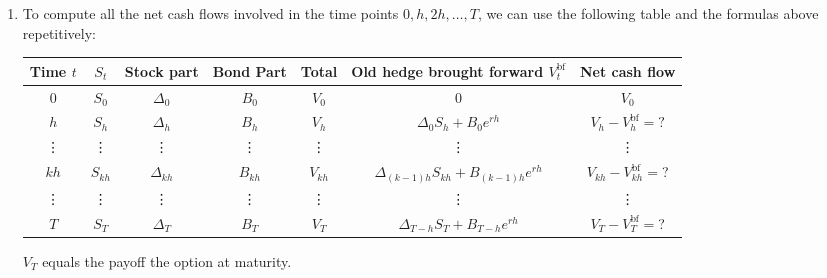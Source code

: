 \begin{enumerate}
\item To compute all the net cash flows involved in the time points
\(0,h,2h,\dotsc,T\), we can use the following table and the formulas above
repetitively:
\begin{center}
\begin{tabular}{cc|ccc|cc}
\toprule
Time \(t\)&\(S_t\)&Stock part& Bond Part&Total&Old hedge brought forward \(V_t^{\mathrm{bf}}\)&Net cash flow\\
\midrule
\(0\)&\(S_0\)&\(\Delta_0\)&\(B_0\)&\(V_0\)&\(0\)&\(V_0\) \\
\(h\)&\(S_h\)&\(\Delta_h\)&\(B_h\)&\(V_h\)&\(\Delta_0 S_h+B_0e^{rh}\)&\(V_h-V_h^{\mathrm{bf}}=?\)\\
\vdots&\vdots&\vdots&\vdots&\vdots&\vdots&\vdots \\
\(kh\)&\(S_{kh}\)&\(\Delta_{kh}\)&\(B_{kh}\)&\(V_{kh}\)&\(\Delta_{(k-1)h}S_{kh}+B_{(k-1)h}e^{rh}\)&\(V_{kh}-V_{kh}^{\mathrm{bf}}=\)?\\
\vdots&\vdots&\vdots&\vdots&\vdots&\vdots&\vdots \\
\(T\)&\(S_{T}\)&\(\Delta_{T}\)&\(B_{T}\)&\(V_{T}\)&\(\Delta_{T-h}S_T+B_{T-h}e^{rh}\)&\(V_{T}-V_{T}^{\mathrm{bf}}=\)?\\
\bottomrule
\end{tabular}
\end{center}
\begin{note}
\(V_T\) equals the payoff the option at maturity.
\end{note}
\end{enumerate}

